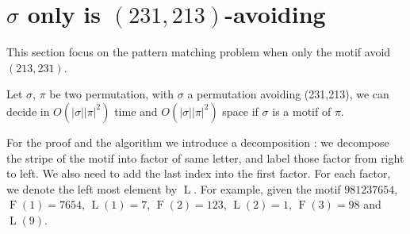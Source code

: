 \documentclass[a4paper]{llncs}
\newcommand{\ptext}{\pi}
\newcommand{\pmotif}{\sigma}
\DeclareMathOperator{\firsta}{L}
\newcommand{\first}[1]{\firsta({#1})}
\DeclareMathOperator{\factora}{F}
\newcommand{\factor}[1]{\factora({#1})}
\begin{document}

\section{$\sigma$ only is $(231,213)$-avoiding}	
\label{section:sigma only avoid 231 and 213}

This section focus on the pattern matching problem when only the motif avoid $(213,231)$.

\begin{proposition}
Let $\pmotif$, $\ptext$ 
be two permutation,
with  $\pmotif$ a permutation avoiding (231,213), 
we can decide in $O(|\pmotif||\ptext|^2)$ time
and $O(|\pmotif||\ptext|^2)$ space
if $\pmotif$ 
is a motif of $\ptext$.
\end{proposition}

			

			
For the proof and the algorithm we introduce a decomposition : we decompose the stripe of the motif into factor of same letter, and label those factor from right to left. We also need to add the last index into the first factor. For each factor, we denote the left most element by $\firsta$. For example, given the motif $981237654$, $\factor{1} =7654$, $\first{1}=7$, $\factor{2}=123$, $\first{2}=1$, $\factor{3}=98$ and $\first{9}$. \\
			
\end{document}
